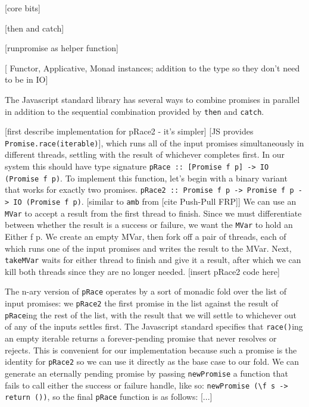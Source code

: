\documentclass[sigplan,screen,review]{acmart}
\newcommand{\lit}[1]{\lstinline{#1}}
\begin{document}
[core bits]

[then and catch]

[runpromise as helper function]

[ Functor, Applicative, Monad instances; addition to the type so they don't need to be in IO]

The Javascript standard library has several ways to combine promises in parallel in addition to the sequential combination provided by \lit{then} and \lit{catch}.

[first describe implementation for pRace2 - it's simpler]
[JS provides \lit{Promise.race(iterable)}], which runs all of the input promises simultaneously in different threads, settling with the result of whichever completes first.  In our system this should have type signature \lit{pRace :: [Promise f p] -> IO (Promise f p)}.  To implement this function, let's begin with a binary variant that works for exactly two promises.  \lit{pRace2 :: Promise f p -> Promise f p -> IO (Promise f p)}.  [similar to \lit {amb} from [cite Push-Pull FRP]]  We can use an \lit{MVar} to accept a result from the first thread to finish.  Since we must differentiate between whether the result is a success or failure, we want the \lit{MVar} to hold an {Either f p}.  We create an empty MVar, then fork off a pair of threads, each of which runs one of the input promises and writes the result to the MVar.  Next, \lit{takeMVar} waits for either thread to finish and give it a result, after which we can kill both threads since they are no longer needed.
[insert pRace2 code here]

The n-ary version of \lit{pRace} operates by a sort of monadic fold over the list of input promises: we \lit{pRace2} the first promise in the list against the result of \lit{pRace}ing the rest of the list, with the result that we will settle to whichever out of any of the inputs settles first.  The Javascript standard specifies that \lit{race()}ing an empty iterable returns a forever-pending promise that never resolves or rejects.  This is convenient for our implementation because such a promise is the identity for \lit{pRace2} so we can use it directly as the base case to our fold.  We can generate an eternally pending promise by passing \lit{newPromise} a function that fails to call either the success or failure handle, like so: \verb|newPromise (\f s -> return ())|, so the final \lit{pRace} function is as follows:
[...]
\end{document}
